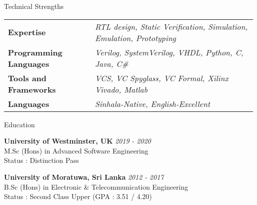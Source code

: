 \documentclass[
11pt, %
]{./assets/resume} %
\begin{document}
\begin{rSection}{Technical Strengths}
	
	\def\arraystretch{1.5}
	
	\begin{tabular}{p{2.0in} p{4.5in}}
		\textbf{Expertise} & \emph{RTL design, Static Verification, Simulation, Emulation, Prototyping} \\
		\textbf{Programming Languages} & \emph{Verilog, SystemVerilog, VHDL, Python, C,  Java, C\#} \\
		\textbf{Tools and Frameworks} & \emph{VCS, VC Spyglass, VC Formal, Xilinx Vivado, Matlab} \\ 
		\textbf{Languages} & \emph{Sinhala-Native, English-Excellent} \\
	\end{tabular}
	
\end{rSection}


\begin{rSection}{Education}
	
	\textbf{University of Westminster, UK} \hfill \textit{2019 - 2020} \\ 
	M.Sc (Hons) in Advanced Software Engineering \\
	Status : Distinction Pass

	\textbf{University of Moratuwa, Sri Lanka} \hfill \textit{2012 - 2017} \\ 
	B.Sc (Hons) in Electronic \& Telecommunication Engineering \\
	Status : Second Class Upper (GPA : 3.51 / 4.20)
	
\end{rSection}

\end{document}
